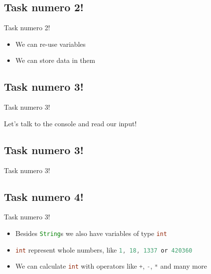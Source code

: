 \subsection{Task numero 2!}
\begin{frame}[fragile]{Task numero 2!}
	\begin{itemize}[<+->]
		\item We can re-use variables
		\item We can store data in them
	\end{itemize}
\end{frame}


\subsection{Task numero 3!}
\begin{frame}[fragile]{Task numero 3!}
	\begin{center}
		Let's talk to the console and read our input!
	\end{center}
\end{frame}



\subsection{Task numero 3!}
\begin{frame}[fragile]{Task numero 3!}
	\begin{center}
		
	\end{center}
\end{frame}


\subsection{Task numero 4!}
\begin{frame}[fragile]{Task numero 3!}
	\begin{itemize}[<+->]
		\item Besides \lstinline[language=Java]{String}s we also have variables of type \lstinline[language=Java]{int}\\
		\item \lstinline[language=Java]{int} represent whole numbers, like \lstinline[language=Java]{1, 18, 1337 or 420360}\\
		\item We can calculate \lstinline[language=Java]{int} with operators like \lstinline[language=Java]{+}, \lstinline[language=Java]{-}, \lstinline[language=Java]{*} and many more
	\end{itemize}
\end{frame}


